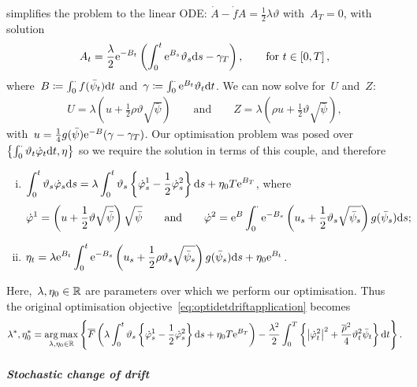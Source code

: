 simplifies the problem to the linear ODE:
$\dot{A}- \dot{f}A = \frac{1}{2}\lambda\vartheta$ with~$A_T = 0$,
with solution
\[
A_t = \frac{\lambda}{2} \mathrm{e}^{-B_t}\left( \int_0^t \mathrm{e}^{B_s} \vartheta_s \mathrm{d} s - \gamma_T \right),
\qquad \text{for } t\in[0,T]\,,
\]
where~$B\coloneqq\int_0^\cdot f(\bar\psi_t)\mathrm{d} t$ and~$\gamma \coloneqq \int_0^\cdot \mathrm{e}^{B_t}\vartheta_t \mathrm{d} t$. 
We can now solve for~$U$ and~$Z$:
\begin{align*}
U = \lambda\left( u + \frac{1}{2}\rho\vartheta\sqrt{\bar\psi} \right)
\qquad \text{and} \qquad
Z = \lambda\left ( \rho u + \frac{1}{2}\vartheta\sqrt{\bar\psi} \right),
\end{align*}
with~$u = \frac{1}{4}g(\bar\psi)\mathrm{e}^{-B}(\gamma-\gamma_T)$. Our optimisation problem was posed over~$\left \{\int_0^\cdot \vartheta_t \dot{\varphi}_t \mathrm{d} t, \eta\right \}$ so we require the solution in terms of this couple, and therefore
\begin{enumerate}[(i)]
\item 
$\displaystyle
\int_0^t \vartheta_s \dot{\varphi}_s \mathrm{d} s = \lambda\int_0^t \vartheta_s \left \{ \dot{\varphi}^1_s - \frac{1}{2}\dot{\varphi}^2_s \right \}\mathrm{d} s + \eta_0 T \mathrm{e}^{B_T}$,
where
$$
\dot{\varphi}^1 = \left(u+ \frac{1}{2}\vartheta \sqrt{\bar\psi}\right)\sqrt{\bar\psi}
\qquad\text{and}\qquad
\dot{\varphi}^2 = \mathrm{e}^B \int_0^\cdot \mathrm{e}^{-B_s}\left( u_s + \frac{1}{2}\vartheta_s\sqrt{\bar\psi_s} \right )g(\bar\psi_s)\mathrm{d} s;
$$
\item 
$\displaystyle \eta_t = \lambda \mathrm{e}^{B_t} \int_0^t \mathrm{e}^{-B_s}\left( u_s + \frac{1}{2}\rho\vartheta_s\sqrt{\bar\psi_s} \right )g(\bar\psi_s)\mathrm{d} s + \eta_0 \mathrm{e}^{B_t}$.
\end{enumerate}
Here,~$\lambda,\eta_0\in\mathbb{R}$ are parameters over which we perform our optimisation. 
Thus the original optimisation objective~\eqref{eq:optidetdriftapplication} becomes 
\begin{align*}
\lambda^{*}, \eta_0^{*} = \operatorname*{arg\,max}_{\lambda,\eta_0\in\mathbb{R}}
\left\{\overline{F}\left( \lambda\int_0^t \vartheta_s \left \{ \dot{\varphi}^1_s - \frac{1}{2}\dot{\varphi}^2_s \right \}\mathrm{d} s + \eta_0 T \mathrm{e}^{B_T} \right ) - \frac{\lambda^2}{2}\int_0^T\left\{ \big| \dot{\varphi}^2_t \big|^2 + \frac{\overline{\rho}^2}{4}\vartheta_t^2\bar\psi_t \right\}\mathrm{d} t\right\}.
\end{align*}

\paragraph{\textit{Stochastic change of drift}}

